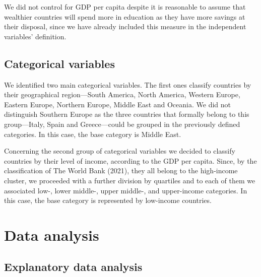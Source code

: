 \documentclass[
]{article}
\begin{document}
We did not control for GDP per capita despite it is reasonable to assume
that wealthier countries will spend more in education as they have more
savings at their disposal, since we have already included this measure
in the independent variables' definition.

\hypertarget{categorical-variables}{%
\subsection{Categorical variables}\label{categorical-variables}}

We identified two main categorical variables. The first ones classify
countries by their geographical region---South America, North America,
Western Europe, Eastern Europe, Northern Europe, Middle East and
Oceania. We did not distinguish Southern Europe as the three countries
that formally belong to this group---Italy, Spain and Greece---could be
grouped in the previously defined categories. In this case, the base
category is Middle East.

Concerning the second group of categorical variables we decided to
classify countries by their level of income, according to the GDP per
capita. Since, by the classification of The World Bank (2021), they all
belong to the high-income cluster, we proceeded with a further division
by quartiles and to each of them we associated low-, lower middle-,
upper middle-, and upper-income categories. In this case, the base
category is represented by low-income countries.

\hypertarget{data-analysis}{%
\section{Data analysis}\label{data-analysis}}

\hypertarget{explanatory-data-analysis}{%
\subsection{Explanatory data analysis}\label{explanatory-data-analysis}}
\end{document}
